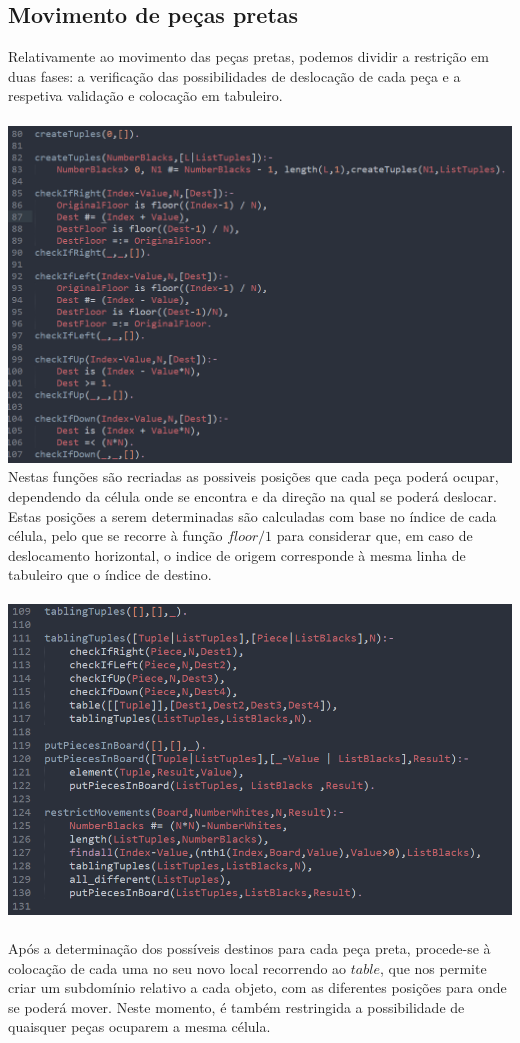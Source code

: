 \subsection{Movimento de pe\c{c}as pretas}
Relativamente ao movimento das pe\c{c}as pretas, podemos dividir a restri\c{c}\~ao em duas fases: a verifica\c{c}\~ao das possibilidades de desloca\c{c}\~ao de cada pe\c{c}a e a respetiva valida\c{c}\~ao e coloca\c{c}\~ao em tabuleiro.
\\ \\
\includegraphics[scale=0.5]{movement-checkers.png}
\\ 
Nestas fun\c{c}\~oes s\~ao recriadas as possiveis posi\c{c}\~oes que cada pe\c{c}a poder\'a ocupar, dependendo da c\'elula onde se encontra e da dire\c{c}\~ao na qual se poder\'a deslocar. Estas posi\c{c}\~oes a serem determinadas s\~ao calculadas com base no \'indice de cada c\'elula, pelo que se recorre \`a fun\c{c}\~ao $floor/1$ para considerar que, em caso de deslocamento horizontal, o indice de origem corresponde \`a mesma linha de tabuleiro que o \'indice de destino.
\\ \\
\includegraphics[scale=0.4]{movement-validators.png}
\\ \\
Ap\'os a determina\c{c}\~ao dos poss\'iveis destinos para cada pe\c{c}a preta, procede-se \`a coloca\c{c}\~ao de cada uma no seu novo local recorrendo ao $table$, que nos permite criar um subdom\'inio relativo a cada objeto, com as diferentes posi\c{c}\~oes para onde se poder\'a mover. Neste momento, \'e tamb\'em restringida a possibilidade de quaisquer pe\c{c}as ocuparem a mesma c\'elula.

